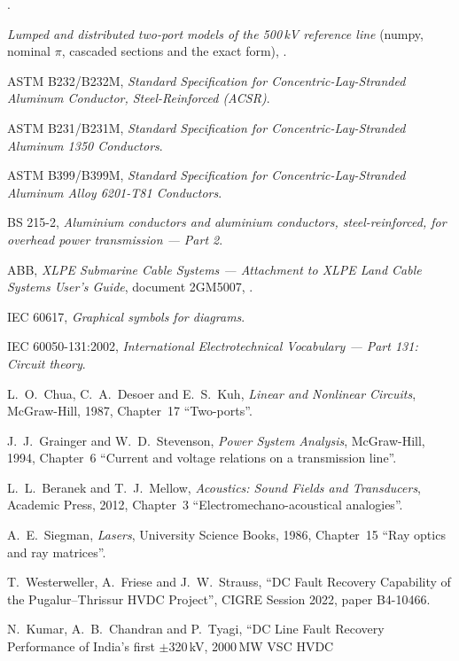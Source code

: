 \begin{enumerate}[label={[\arabic*]}, leftmargin=*, itemsep=0.4em]
        .
  \item \emph{Lumped and distributed two-port models of the 500\,kV reference
        line} (numpy, nominal $\pi$, cascaded sections and the exact form),
        .
  \item ASTM B232/B232M, \emph{Standard Specification for Concentric-Lay-Stranded
        Aluminum Conductor, Steel-Reinforced (ACSR)}.
  \item ASTM B231/B231M, \emph{Standard Specification for Concentric-Lay-Stranded
        Aluminum 1350 Conductors}.
  \item ASTM B399/B399M, \emph{Standard Specification for Concentric-Lay-Stranded
        Aluminum Alloy 6201-T81 Conductors}.
  \item BS 215-2, \emph{Aluminium conductors and aluminium conductors,
        steel-reinforced, for overhead power transmission --- Part 2}.
  \item ABB, \emph{XLPE Submarine Cable Systems --- Attachment to XLPE Land
        Cable Systems User's Guide}, document 2GM5007, .
  \item IEC 60617, \emph{Graphical symbols for diagrams}.
  \item IEC 60050-131:2002, \emph{International Electrotechnical Vocabulary ---
        Part 131: Circuit theory}.
  \item L.~O.~Chua, C.~A.~Desoer and E.~S.~Kuh, \emph{Linear and Nonlinear
        Circuits}, McGraw-Hill, 1987, Chapter~17 ``Two-ports''.
  \item J.~J.~Grainger and W.~D.~Stevenson, \emph{Power System Analysis},
        McGraw-Hill, 1994, Chapter~6 ``Current and voltage relations on a
        transmission line''.
  \item L.~L.~Beranek and T.~J.~Mellow, \emph{Acoustics: Sound Fields and
        Transducers}, Academic Press, 2012, Chapter~3 ``Electromechano-acoustical
        analogies''.
  \item A.~E.~Siegman, \emph{Lasers}, University Science Books, 1986,
        Chapter~15 ``Ray optics and ray matrices''.
  \item T.~Westerweller, A.~Friese and J.~W.~Strauss, ``DC Fault Recovery
        Capability of the Pugalur--Thrissur HVDC Project'', CIGRE Session
        2022, paper B4-10466.
  \item N.~Kumar, A.~B.~Chandran and P.~Tyagi, ``DC Line Fault Recovery
        Performance of India's first $\pm$320\,kV, 2000\,MW VSC HVDC

\end{enumerate}
